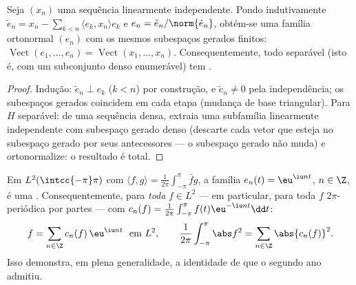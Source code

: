 \begin{proposition}\label{prop:b3:hilbert:gramschmidt}
Seja $(x_n)$ uma sequência linearmente independente. Pondo
indutivamente $\tilde e_n = x_n - \sum_{k<n}\langle e_k,
x_n\rangle e_k$ e $e_n = \tilde e_n/\norm{\tilde e_n}$, obtém-se uma família ortonormal $(e_n)$
com os mesmos subespaços gerados finitos: $\operatorname{Vect}(e_1, \dots, e_n) = \operatorname{Vect}
(x_1, \dots, x_n)$. Consequentemente, todo
 separável (isto é, com um subconjunto denso
enumerável) tem .
\end{proposition}

\begin{proof}
Indução: $\tilde e_n \perp e_k$ ($k < n$) por construção, e $\tilde e_n \neq 0$ pela independência;
os subespaços gerados coincidem em cada etapa (mudança de base
triangular). Para $H$ separável: de uma sequência densa, extraia uma
subfamília linearmente independente com subespaço gerado denso
(descarte cada vetor que esteja no subespaço gerado por seus
antecessores --- o subespaço gerado não muda) e ortonormalize: o
resultado é total.
\end{proof}

\begin{theorem}
\label{thm:b3:hilbert:fourier}
Em $L^2(\intcc{-\pi}\pi)$ com $\langle f, g\rangle =
\frac1{2\pi}\int_{-\pi}^\pi \bar fg$, a família $e_n(t) =
\eu^{\iu nt}$, $n \in \Z$, é uma .
Consequentemente, para \emph{toda} $f \in L^2$ --- em particular, para toda
$f$ $2\pi$-periódica  por partes --- com $c_n(f) =
\frac1{2\pi}\int_{-\pi}^{\pi}f(t)\eu^{-\iu nt}\dd t$:
\[
f = \sum_{n\in\Z}c_n(f)\,\eu^{\iu nt} \ \ \text{em } L^2,
\qquad
\frac1{2\pi}\int_{-\pi}^{\pi}\abs f^2 =
\sum_{n\in\Z}\abs{c_n(f)}^2 .
\]
Isso demonstra, em plena generalidade, a identidade de  que o
segundo ano admitiu.
\end{theorem}

